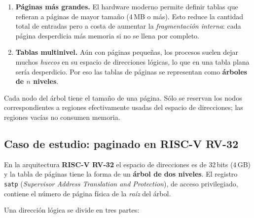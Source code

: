 \documentclass[11pt,a4paper]{article}
\begin{document}
\begin{enumerate}[leftmargin=*]
    \item \textbf{Páginas más grandes.} El hardware moderno permite
        definir tablas que refieran a páginas de mayor tamaño (4\,MB o
        más). Esto reduce la cantidad total de entradas pero a costa
        de aumentar la \emph{fragmentación interna}: cada página
        desperdicia más memoria si no se llena por completo.
    \item \textbf{Tablas multinivel.} Aún con páginas pequeñas, los
        procesos suelen dejar muchos \emph{huecos} en su espacio de
        direcciones lógicas, lo que en una tabla plana sería
        desperdicio. Por eso las tablas de páginas se representan como
        \textbf{árboles de $n$ niveles}.
\end{enumerate}

Cada nodo del árbol tiene el tamaño de una página. Sólo se reservan
los nodos correspondientes a regiones efectivamente usadas del espacio
de direcciones; las regiones vacías no consumen memoria.

\subsection{Caso de estudio: paginado en RISC-V RV-32}

En la arquitectura \textbf{RISC-V RV-32} el espacio de direcciones es
de 32\,bits (4\,GB) y la tabla de páginas tiene la forma de un
\textbf{árbol de dos niveles}. El registro \texttt{satp}
(\emph{Supervisor Address Translation and Protection}), de acceso
privilegiado, contiene el número de página física de la \emph{raíz} del
árbol.

\begin{center}
\end{center}

Una dirección lógica se divide en tres partes:
\end{document}
